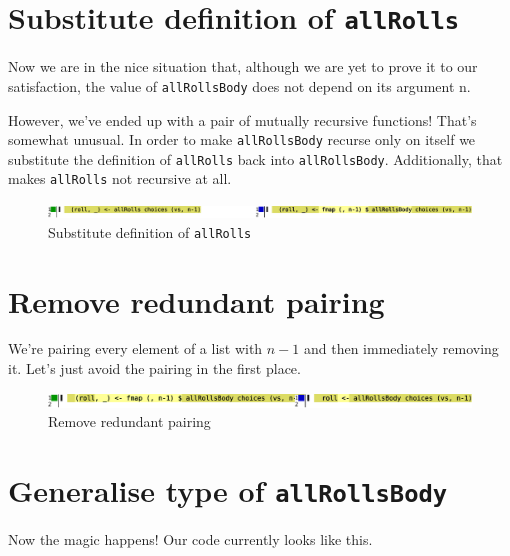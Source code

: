 \section{Substitute definition of \texttt{allRolls}}

Now we are in the nice situation that, although we are yet to prove it to our satisfaction, the value of \texttt{allRollsBody} does not depend on its argument n.

However, we've ended up with a pair of mutually recursive functions! That's somewhat unusual. In order to make \texttt{allRollsBody} recurse only on itself we substitute the definition of \texttt{allRolls} back into \texttt{allRollsBody}. Additionally, that makes \texttt{allRolls} not recursive at all.

\begin{figure}[htbp]
 \centering
 \includegraphics[width=\linewidth]{./pics/diff22.pdf}
 \caption{Substitute definition of \texttt{allRolls}}
 \label{fig:diff22}
\end{figure}


\section{Remove redundant pairing}


We're pairing every element of a list with $n-1$ and then immediately removing it. Let's just avoid the pairing in the first place.

\begin{figure}[htbp]
 \centering
 \includegraphics[width=\linewidth]{./pics/diff23.pdf}
 \caption{Remove redundant pairing}
 \label{fig:diff23}
\end{figure}


\section{Generalise type of \texttt{allRollsBody}}


Now the magic happens! Our code currently looks like this.

